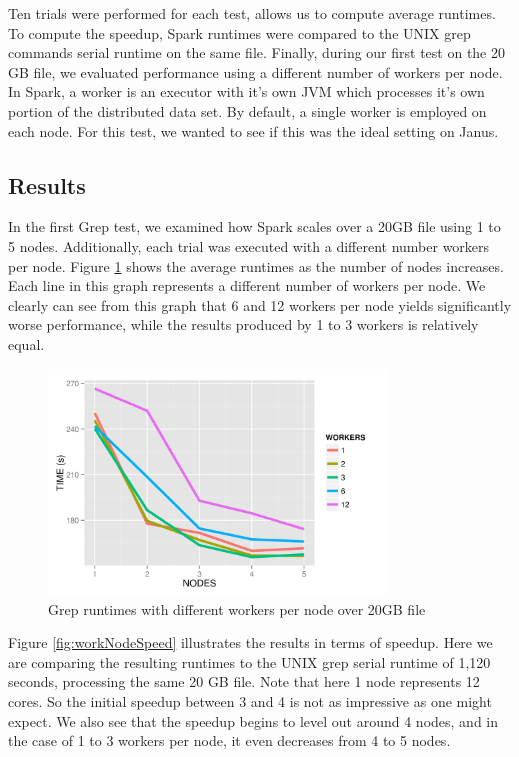 \documentclass{article}
\begin{document}
Ten trials were performed for each test, allows us to compute average
runtimes. To compute the speedup, Spark runtimes were compared to the UNIX grep
commands serial runtime on the same file. Finally, during our first test on the
20 GB file, we evaluated performance using a different number of workers per
node.  In Spark, a worker is an executor with it's own JVM which processes it's
own portion of the distributed data set. By default, a single worker is
employed on each node. For this test, we wanted to see if this was the ideal
setting on Janus.


\subsection{Results}
In the first Grep test, we examined how Spark scales over a 20GB file using 1
to 5 nodes. Additionally, each trial was executed with a different number
workers per node. Figure \ref{fig:workNodeTime} shows the average runtimes as
the number of nodes increases. Each line in this graph represents a different
number of workers per node. We clearly can see from this graph that 6 and 12
workers per node yields significantly worse performance, while the results
produced by 1 to 3 workers is relatively equal.

    \begin{figure}[H]
        \centering
        \includegraphics[width=90mm]{images/workerPerNodeTimes.png}
        \caption{Grep runtimes with different workers per node over 20GB file}
        \label{fig:workNodeTime}
    \end{figure}

Figure \ref{fig:workNodeSpeed} illustrates the results in terms of speedup.
Here we are comparing the resulting runtimes to the UNIX grep serial runtime of
1,120 seconds, processing the same 20 GB file. Note that here 1 node represents
12 cores.  So the initial speedup between 3 and 4 is not as impressive as one
might expect.  We also see that the speedup begins to level out around 4 nodes,
and in the case of 1 to 3 workers per node, it even decreases from 4 to 5
nodes.
\end{document}
